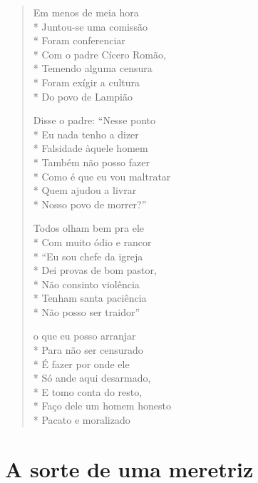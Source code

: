 \begin{verse}
Em menos de meia hora\\*
Juntou-se uma comissão\\*
Foram conferenciar\\*
Com o padre Cícero Romão,\\*
Temendo alguma censura\\*
Foram exígir a cultura\\*
Do povo de Lampião

Disse o padre: ``Nesse ponto\\*
Eu nada tenho a dizer\\*
Falsidade àquele homem\\*
Também não posso fazer\\*
Como é que eu vou maltratar\\*
Quem ajudou a livrar\\*
Nosso povo de morrer?''

Todos olham bem pra ele\\*
Com muito ódio e rancor\\*
``Eu sou chefe da igreja\\*
Dei provas de bom pastor,\\*
Não consinto violência\\*
Tenham santa paciência\\*
Não posso ser traidor''

o que eu posso arranjar\\*
Para não ser censurado\\*
É fazer por onde ele\\*
Só ande aqui desarmado,\\*
E tomo conta do resto,\\*
Faço dele um homem honesto\\*
Pacato e moralizado

\end{verse}

\chapter{A sorte de uma meretriz}

